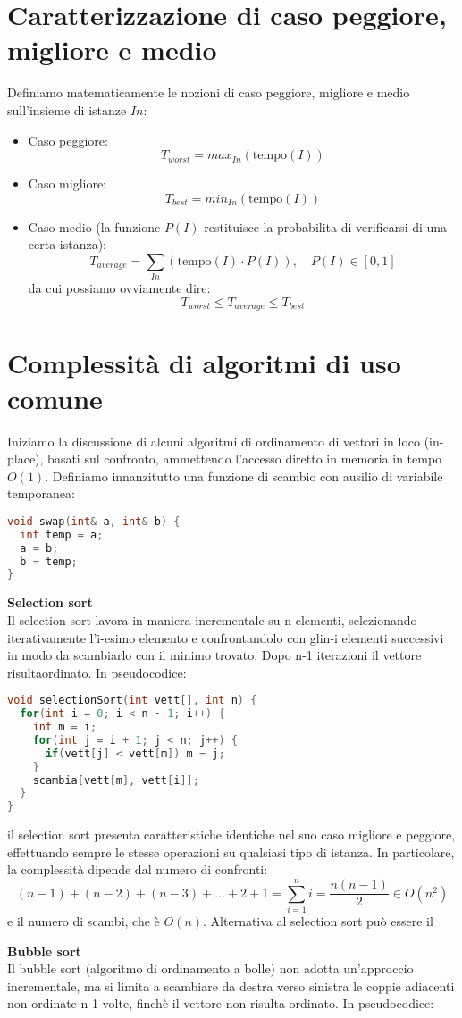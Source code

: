 \documentclass[a4paper,12pt]{article}
\begin{document}
\section{Caratterizzazione di caso peggiore, migliore e medio}
Definiamo matematicamente le nozioni di caso peggiore, migliore e medio sull'insieme di istanze $In$:
\begin{itemize}
  \item Caso peggiore:
    $$ T_{worst} = max_{In}(\mathrm{tempo}(I)) $$
  \item Caso migliore:
    $$ T_{best}  = min_{In}(\mathrm{tempo}(I)) $$
  \item Caso medio (la funzione $P(I)$ restituisce la probabilita di verificarsi di una certa istanza):
    $$ T_{average} = \sum_{In}(\mathrm{tempo}(I) \cdot P(I)), \quad P(I) \in [0, 1] $$
    da cui possiamo ovviamente dire:
    $$ T_{worst} \leq T_{average} \leq T_{best} $$
\end{itemize}

\section{Complessità di algoritmi di uso comune}
Iniziamo la discussione di alcuni algoritmi di ordinamento di vettori in loco (in-place), basati sul confronto,
ammettendo l'accesso diretto in memoria in tempo $O(1)$. Definiamo innanzitutto una funzione di scambio con
ausilio di variabile temporanea:
\begin{lstlisting}[language=C++]
void swap(int& a, int& b) {
  int temp = a;
  a = b;
  b = temp;
}
\end{lstlisting}
\par \medskip
\textbf{Selection sort} \\
Il selection sort lavora in maniera incrementale su n elementi, selezionando iterativamente l'i-esimo elemento
e confrontandolo con glin-i elementi successivi in modo da scambiarlo con il minimo trovato. Dopo n-1 
iterazioni il vettore risultaordinato. In pseudocodice:

\begin{lstlisting}[language=C++]
void selectionSort(int vett[], int n) {
  for(int i = 0; i < n - 1; i++) {
    int m = i;
    for(int j = i + 1; j < n; j++) {
      if(vett[j] < vett[m]) m = j;
    }
    scambia[vett[m], vett[i]];
  }
}
\end{lstlisting}

il selection sort presenta caratteristiche identiche nel suo caso migliore e peggiore, effettuando sempre le stesse
operazioni su qualsiasi tipo di istanza. In particolare, la complessità dipende dal numero di confronti:
$$ (n-1)+(n-2)+(n-3)+...+2+1 = \sum_{i=1}^{n} i = \frac{n(n-1)}{2} \in O(n^2) $$
e il numero di scambi, che è $O(n)$. Alternativa al selection sort può essere il
\par \medskip
\textbf{Bubble sort} \\
Il bubble sort (algoritmo di ordinamento a bolle) non adotta un'approccio incrementale, ma si limita a scambiare
da destra verso sinistra le coppie adiacenti non ordinate n-1 volte, finchè il vettore non risulta ordinato.
In pseudocodice:
\end{document}
